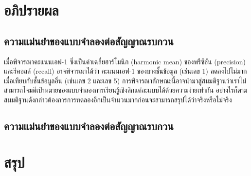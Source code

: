\documentclass{cpepaper}
\begin{document}
\section{อภิปรายผล}

\subsection{ความแม่นยำของแบบจำลองต่อสัญญาณรบกวน}

เมื่อพิจารณาคะแนนเอฟ-1 ซึ่งเป็นค่าเฉลี่ยฮาร์โมนิก (harmonic mean) ของพรีซิชัน (precision) และรีคอลล์ (recall) อาจพิจารณาได้ว่า คะแนนเอฟ-1 ของบางชั้นข้อมูล (เช่นเลข 1) ลดลงไปไม่มากเมื่อเทียบกับชั้นข้อมูลอื่น (เช่นเลข 2 และเลข 5) การพิจารณาลักษณะนี้อาจนำมาสู่สมมติฐานว่าเราไม่สามารถโจมตีเป้าหมายของแบบจำลองการเรียนรู้เชิงลึกแต่ละแบบได้ด้วยความง่ายเท่ากัน อย่างไรก็ตาม สมมติฐานดังกล่าวต้องการการทดลองอีกเป็นจำนวนมากก่อนจะสามารถสรุปได้ว่าจริงหรือไม่จริง

\subsection{ความแม่นยำของแบบจำลองต่อสัญญาณรบกวน}

\section{สรุป}
\end{document}
